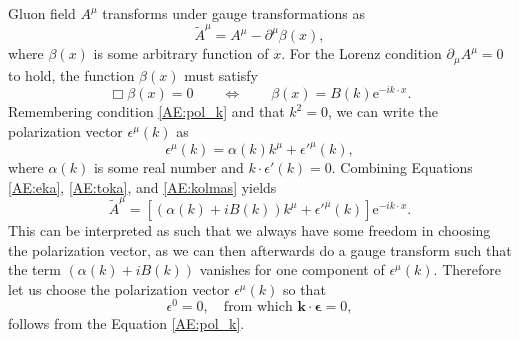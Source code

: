 \documentclass[a4paper, twoside, english, 12pt]{report}
\begin{document}
Gluon field $A^\mu$ transforms under gauge transformations as 
\begin{equation}\label{AE:eka}
	\tilde{A}^\mu = A^\mu - \partial^\mu\beta(x),
\end{equation}
where $\beta(x)$ is some arbitrary function of $x$. For the Lorenz condition $\partial_\mu A^\mu=0$ to hold, the function $\beta(x)$ must satisfy
\begin{equation}\label{AE:toka}
	\Box\beta(x)=0 \qquad \Leftrightarrow \qquad \beta(x) = B(k)\text{e}^{-ik\cdot x}.
\end{equation}
Remembering condition \eqref{AE:pol_k} and that $k^2=0$, we can write the polarization vector $\epsilon^\mu(k)$ as
\begin{equation}\label{AE:kolmas}
	\epsilon^\mu(k) = \alpha(k) k^\mu + \epsilon'^\mu(k),
\end{equation}
where $\alpha(k)$ is some real number and $k\cdot\epsilon'(k)=0$. Combining Equations \ref{AE:eka}, \ref{AE:toka}, and \ref{AE:kolmas} yields
\begin{equation}
	\tilde{A}^\mu = \left[(\alpha(k)+iB(k))k^\mu + \epsilon'^\mu(k)\right]\text{e}^{-ik\cdot x}.
\end{equation}
This can be interpreted as such that we always have some freedom in choosing the polarization vector, as we can then afterwards do a gauge transform such that the term $(\alpha(k)+iB(k))$ vanishes for one component of $\epsilon^\mu(k)$. Therefore let us choose the polarization vector $\epsilon^\mu(k)$ so that
\begin{equation}\label{AE:pol_self}
\epsilon^0 = 0, \quad\text{from which } \mathbf{k}\cdot \mathbf{\epsilon}=0,
\end{equation}
follows from the Equation \eqref{AE:pol_k}.
\end{document}
